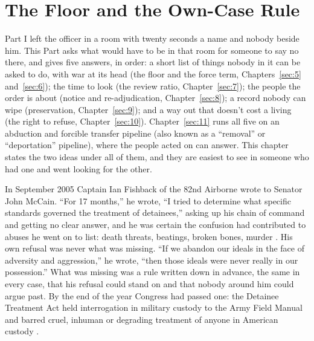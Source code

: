 \chapter{The Floor and the Own-Case Rule}
\label{sec:4}
Part I left the officer in a room with twenty seconds a name and nobody beside him. This Part asks what would have to be in that room for someone to say no there, and gives five answers, in order: a short list of things nobody in it can be asked to do, with war at its head (the floor and the force term, Chapters~\ref{sec:5} and~\ref{sec:6}); the time to look (the review ratio, Chapter~\ref{sec:7}); the people the order is about (notice and re-adjudication, Chapter~\ref{sec:8}); a record nobody can wipe (preservation, Chapter~\ref{sec:9}); and a way out that doesn't cost a living (the right to refuse, Chapter~\ref{sec:10}). Chapter~\ref{sec:11} runs all five on an abduction and forcible transfer pipeline (also known as a “removal” or “deportation” pipeline), where the people acted on can answer. This chapter states the two ideas under all of them, and they are easiest to see in someone who had one and went looking for the other.

In September 2005 Captain Ian Fishback of the 82nd Airborne wrote to Senator John McCain. “For 17 months,” he wrote, “I tried to determine what specific standards governed the treatment of detainees,” asking up his chain of command and getting no clear answer, and he was certain the confusion had contributed to abuses he went on to list: death threats, beatings, broken bones, murder \autocite{fishback2005honor}. His own refusal was never what was missing. “If we abandon our ideals in the face of adversity and aggression,” he wrote, “then those ideals were never really in our possession.” What was missing was a rule written down in advance, the same in every case, that his refusal could stand on and that nobody around him could argue past. By the end of the year Congress had passed one: the Detainee Treatment Act held interrogation in military custody to the Army Field Manual and barred cruel, inhuman or degrading treatment of anyone in American custody \autocite{dta2005}.

